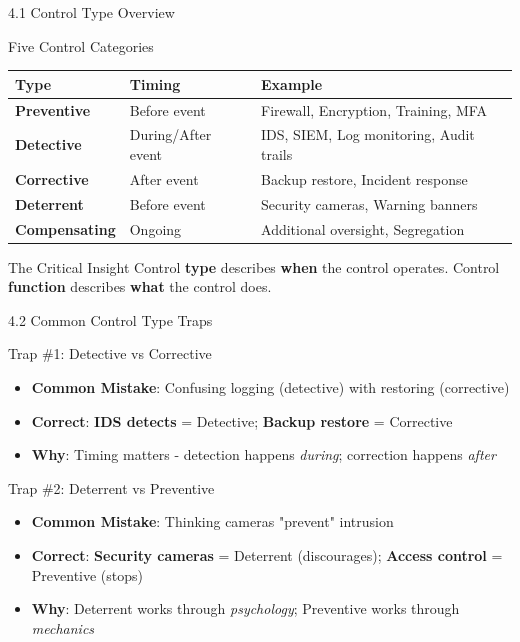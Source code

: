 \documentclass{beamer}
\begin{document}
	\begin{frame}{4.1 Control Type Overview}
		\begin{block}{Five Control Categories}
			\begin{tabular}{|p{2.5cm}|p{4cm}|p{4.5cm}|}
				\hline
				\textbf{Type} & \textbf{Timing} & \textbf{Example} \\
				\hline
				\textbf{Preventive} & Before event & Firewall, Encryption, Training, MFA \\
				\hline
				\textbf{Detective} & During/After event & IDS, SIEM, Log monitoring, Audit trails \\
				\hline
				\textbf{Corrective} & After event & Backup restore, Incident response \\
				\hline
				\textbf{Deterrent} & Before event & Security cameras, Warning banners \\
				\hline
				\textbf{Compensating} & Ongoing & Additional oversight, Segregation \\
				\hline
			\end{tabular}
		\end{block}
		
		\begin{alertblock}{The Critical Insight}
			Control \textbf{type} describes \textbf{when} the control operates. Control \textbf{function} describes \textbf{what} the control does.
		\end{alertblock}
	\end{frame}
	
	\begin{frame}{4.2 Common Control Type Traps}
		\begin{block}{Trap \#1: Detective vs Corrective}
			\begin{itemize}
				\item \textbf{Common Mistake}: Confusing logging (detective) with restoring (corrective)
				\item \textbf{Correct}: \textbf{IDS detects} = Detective; \textbf{Backup restore} = Corrective
				\item \textbf{Why}: Timing matters - detection happens \textit{during}; correction happens \textit{after}
			\end{itemize}
		\end{block}
		
		\begin{block}{Trap \#2: Deterrent vs Preventive}
			\begin{itemize}
				\item \textbf{Common Mistake}: Thinking cameras "prevent" intrusion
				\item \textbf{Correct}: \textbf{Security cameras} = Deterrent (discourages); \textbf{Access control} = Preventive (stops)
				\item \textbf{Why}: Deterrent works through \textit{psychology}; Preventive works through \textit{mechanics}
			\end{itemize}
		\end{block}
	\end{frame}
	
\end{document}
